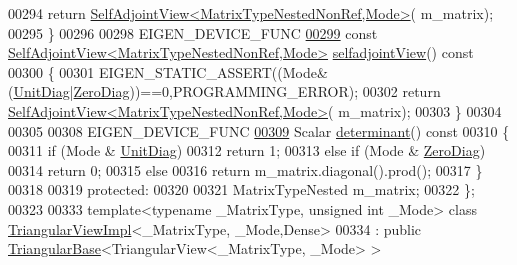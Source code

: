 \begin{DoxyCode}
00294       \textcolor{keywordflow}{return} \hyperlink{group___core___module_class_eigen_1_1_self_adjoint_view}{SelfAdjointView<MatrixTypeNestedNonRef,Mode>}(
      m\_matrix);
00295     \}
00296 
00298     EIGEN\_DEVICE\_FUNC
\hyperlink{group___core___module_ade4c489f8fb9f5e31d3c3a64e19c166a}{00299}     \textcolor{keyword}{const} \hyperlink{group___core___module_class_eigen_1_1_self_adjoint_view}{SelfAdjointView<MatrixTypeNestedNonRef,Mode>} 
      \hyperlink{group___core___module_ade4c489f8fb9f5e31d3c3a64e19c166a}{selfadjointView}()\textcolor{keyword}{ const}
00300 \textcolor{keyword}{    }\{
00301       EIGEN\_STATIC\_ASSERT((Mode&(\hyperlink{group__enums_gga39e3366ff5554d731e7dc8bb642f83cdaddb72f888ac85d5a1c52333e54f9374b}{UnitDiag}|\hyperlink{group__enums_gga39e3366ff5554d731e7dc8bb642f83cda884ff7240392e85aa6e4b3c957e36483}{ZeroDiag}))==0,PROGRAMMING\_ERROR);
00302       \textcolor{keywordflow}{return} \hyperlink{group___core___module_class_eigen_1_1_self_adjoint_view}{SelfAdjointView<MatrixTypeNestedNonRef,Mode>}(
      m\_matrix);
00303     \}
00304 
00305 
00308     EIGEN\_DEVICE\_FUNC
\hyperlink{group___core___module_a39806fdec7a2a1a869e904c31ee8c67c}{00309}     Scalar \hyperlink{group___core___module_a39806fdec7a2a1a869e904c31ee8c67c}{determinant}()\textcolor{keyword}{ const}
00310 \textcolor{keyword}{    }\{
00311       \textcolor{keywordflow}{if} (Mode & \hyperlink{group__enums_gga39e3366ff5554d731e7dc8bb642f83cdaddb72f888ac85d5a1c52333e54f9374b}{UnitDiag})
00312         \textcolor{keywordflow}{return} 1;
00313       \textcolor{keywordflow}{else} \textcolor{keywordflow}{if} (Mode & \hyperlink{group__enums_gga39e3366ff5554d731e7dc8bb642f83cda884ff7240392e85aa6e4b3c957e36483}{ZeroDiag})
00314         \textcolor{keywordflow}{return} 0;
00315       \textcolor{keywordflow}{else}
00316         \textcolor{keywordflow}{return} m\_matrix.diagonal().prod();
00317     \}
00318       
00319   \textcolor{keyword}{protected}:
00320 
00321     MatrixTypeNested m\_matrix;
00322 \};
00323 
00333 \textcolor{keyword}{template}<\textcolor{keyword}{typename} \_MatrixType, \textcolor{keywordtype}{unsigned} \textcolor{keywordtype}{int} \_Mode> \textcolor{keyword}{class }\hyperlink{class_eigen_1_1_triangular_view_impl}{TriangularViewImpl}<\_MatrixType,
      \_Mode,Dense>
00334   : \textcolor{keyword}{public} \hyperlink{group___core___module_class_eigen_1_1_triangular_base}{TriangularBase}<TriangularView<\_MatrixType, \_Mode> >

\end{DoxyCode}
